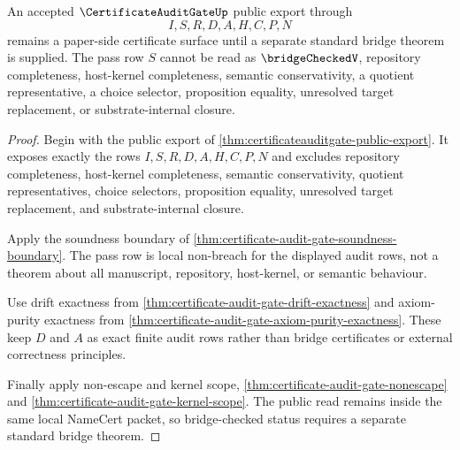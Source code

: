 \begin{theorem}
\label{thm:certificate-audit-gate-bridge-boundary}
An accepted $\CertificateAuditGateUp$ public export through
$$
I,S,R,D,A,H,C,P,N
$$
remains a paper-side certificate surface until a separate standard bridge theorem is supplied. The pass row $S$ cannot be read as $\bridgeCheckedV$, repository completeness, host-kernel completeness, semantic conservativity, a quotient representative, a choice selector, proposition equality, unresolved target replacement, or substrate-internal closure.
\end{theorem}
\begin{proof}
Begin with the public export of \autoref{thm:certificateauditgate-public-export}. It exposes exactly the rows $I,S,R,D,A,H,C,P,N$ and excludes repository completeness, host-kernel completeness, semantic conservativity, quotient representatives, choice selectors, proposition equality, unresolved target replacement, and substrate-internal closure.

Apply the soundness boundary of \autoref{thm:certificate-audit-gate-soundness-boundary}. The pass row is local non-breach for the displayed audit rows, not a theorem about all manuscript, repository, host-kernel, or semantic behaviour.

Use drift exactness from \autoref{thm:certificate-audit-gate-drift-exactness} and axiom-purity exactness from \autoref{thm:certificate-audit-gate-axiom-purity-exactness}. These keep $D$ and $A$ as exact finite audit rows rather than bridge certificates or external correctness principles.

Finally apply non-escape and kernel scope, \autoref{thm:certificate-audit-gate-nonescape} and \autoref{thm:certificate-audit-gate-kernel-scope}. The public read remains inside the same local NameCert packet, so bridge-checked status requires a separate standard bridge theorem.
\end{proof}


